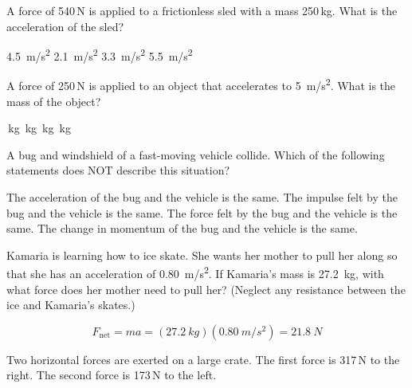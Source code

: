 \documentclass[../main-physics-problems.tex]{subfiles}
\begin{document}
\begin{questions}
\question
A force of 540\,N is applied to a frictionless sled with a mass 250\,kg. What is the acceleration of the sled?

\begin{randomizechoices}
    \choice \SI{4.5}{m/s^2}
    \correctchoice \SI{2.1}{m/s^2}
    \choice \SI{3.3}{m/s^2}
    \choice \SI{5.5}{m/s^2}
\end{randomizechoices}


\question 
A force of 250\,N is applied to an object that accelerates to \SI{5}{m/s^2}. What is the mass of the object?

\begin{randomizechoices}
    \,kg 
    \,kg
    \,kg
    \,kg
\end{randomizechoices}

\question %
A bug and windshield of a fast-moving vehicle collide. Which of the following statements does NOT describe this situation?

\begin{randomizechoices}
    \correctchoice The acceleration of the bug and the vehicle is the same.
    \choice The impulse felt by the bug and the vehicle is the same.
    \choice The force felt by the bug and the vehicle is the same.
    \choice The change in momentum of the bug and the vehicle is the same.
\end{randomizechoices}

\question
Kamaria is learning how to ice skate. She wants her mother to pull her along so that she has an acceleration of \SI{0.80}{m/s^2}. If Kamaria's mass is \SI{27.2}{kg}, with what force does her mother need to pull her? (Neglect any resistance between the ice and Kamaria’s skates.)

\begin{solution}
\phantom{.}

\begin{equation*}
    F_\mathrm{net} = m a = (\SI{27.2}{kg})(\SI{0.80}{m/s^2}) = \boxed{\SI{21.8}{N}}
\end{equation*}
\end{solution}

\question
Two horizontal forces are exerted on a large crate. The first force is 317\,N to the right. The second force is 173\,N to the left. 

\end{questions}
\end{document}
